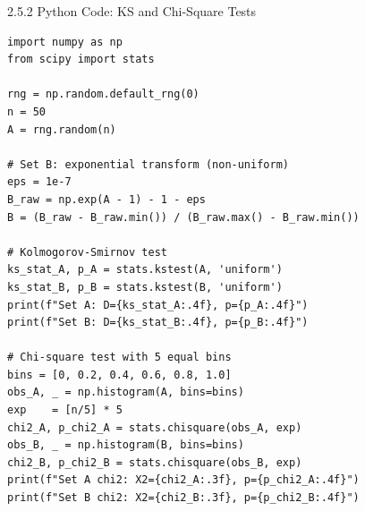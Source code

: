 \documentclass[aspectratio=169,10pt]{beamer}
\begin{document}
\begin{frame}[fragile]{2.5.2 Python Code: KS and Chi-Square Tests}

\begin{lstlisting}[style=python]
import numpy as np
from scipy import stats

rng = np.random.default_rng(0)
n = 50
A = rng.random(n)

# Set B: exponential transform (non-uniform)
eps = 1e-7
B_raw = np.exp(A - 1) - 1 - eps
B = (B_raw - B_raw.min()) / (B_raw.max() - B_raw.min())

# Kolmogorov-Smirnov test
ks_stat_A, p_A = stats.kstest(A, 'uniform')
ks_stat_B, p_B = stats.kstest(B, 'uniform')
print(f"Set A: D={ks_stat_A:.4f}, p={p_A:.4f}")
print(f"Set B: D={ks_stat_B:.4f}, p={p_B:.4f}")

# Chi-square test with 5 equal bins
bins = [0, 0.2, 0.4, 0.6, 0.8, 1.0]
obs_A, _ = np.histogram(A, bins=bins)
exp    = [n/5] * 5
chi2_A, p_chi2_A = stats.chisquare(obs_A, exp)
obs_B, _ = np.histogram(B, bins=bins)
chi2_B, p_chi2_B = stats.chisquare(obs_B, exp)
print(f"Set A chi2: X2={chi2_A:.3f}, p={p_chi2_A:.4f}")
print(f"Set B chi2: X2={chi2_B:.3f}, p={p_chi2_B:.4f}")
\end{lstlisting}

\end{frame}
\end{document}
